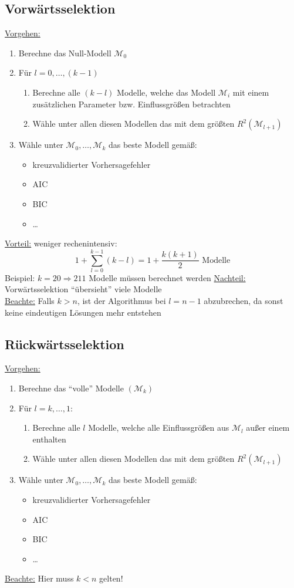 \documentclass[10pt,a4paper]{article}
\begin{document}
\subsection{Vorwärtsselektion}
\underline{Vorgehen:} 
\begin{enumerate}
	\item Berechne das Null-Modell $\mathcal{M}_0$
	\item Für $l=0,\dots,(k-1)$
		\begin{enumerate}
			\item Berechne alle $(k-l)$ Modelle, welche das Modell $\mathcal{M}_i$ mit einem zusätzlichen Parameter bzw. Einflussgrößen betrachten
			\item Wähle unter allen diesen Modellen das mit dem größten $R^{2} (\mathcal{M}_{l+1})$
		\end{enumerate}
	\item Wähle unter $\mathcal{M}_0,\dots,\mathcal{M}_k$ das beste Modell gemäß:
		\begin{itemize}
			\item kreuzvalidierter Vorhersagefehler
			\item AIC
			\item BIC
			\item \dots
		\end{itemize}
\end{enumerate}
\underline{Vorteil:} weniger rechenintensiv:
\[ 1 + \sum\limits_{l=0}^{k-1} (k-l)=1+ \frac{k(k+1)}{2} \text{ Modelle}\]
Beispiel: $k=20 \Rightarrow 211$ Modelle müssen berechnet werden
\underline{Nachteil:} Vorwärtsselektion ``übersieht'' viele Modelle  \\
\underline{Beachte:} Falls $k > n$, ist der Algorithmus bei $l=n-1$ abzubrechen, da sonst keine eindeutigen Lösungen mehr entstehen

\subsection{Rückwärtsselektion}
\underline{Vorgehen:}
\begin{enumerate}
	\item Berechne das ``volle'' Modelle $(\mathcal{M}_k)$
	\item Für $l=k,\dots,1:$
		\begin{enumerate}
			\item Berechne alle $l$ Modelle, welche alle Einflussgrößen aus $\mathcal{M}_l$ außer einem enthalten
			\item Wähle unter allen diesen Modellen das mit dem größten $R^{2} (\mathcal{M}_{l+1})$
		\end{enumerate}
	\item Wähle unter $\mathcal{M}_0,\dots,\mathcal{M}_k$ das beste Modell gemäß:
		\begin{itemize}
			\item kreuzvalidierter Vorhersagefehler
			\item AIC
			\item BIC
			\item \dots
		\end{itemize}
\end{enumerate}
\underline{Beachte:} Hier muss $k < n$ gelten!
\end{document}
